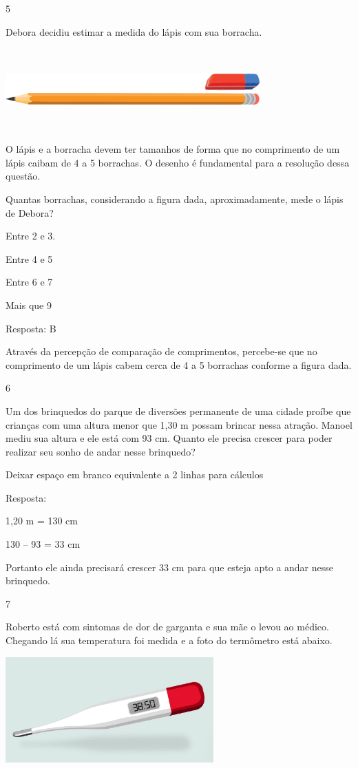 \begin{escolha}
\num{5}

Debora decidiu estimar a medida do lápis com sua borracha.

\includegraphics[width=3.84200in,height=1.23344in]{media/image46.png}

O lápis e a borracha devem ter tamanhos de forma que no comprimento de
um lápis caibam de 4 a 5 borrachas. O desenho é fundamental para a
resolução dessa questão.

Quantas borrachas, considerando a figura dada, aproximadamente, mede o
lápis de Debora?

\begin{escolha}
\item
  Entre 2 e 3.
\item
  Entre 4 e 5
\item
  Entre 6 e 7
\item
  Mais que 9
\end{escolha}

Resposta: B

Através da percepção de comparação de comprimentos, percebe-se que no
comprimento de um lápis cabem cerca de 4 a 5 borrachas conforme a figura
dada.

\num{6}

Um dos brinquedos do parque de diversões permanente de uma cidade proíbe
que crianças com uma altura menor que 1,30 m possam brincar nessa
atração. Manoel mediu sua altura e ele está com 93 cm. Quanto ele
precisa crescer para poder realizar seu sonho de andar nesse brinquedo?

Deixar espaço em branco equivalente a 2 linhas para cálculos

Resposta:

1,20 m = 130 cm

130 -- 93 = 33 cm

Portanto ele ainda precisará crescer 33 cm para que esteja apto a andar
nesse brinquedo.

\num{7}

Roberto está com sintomas de dor de garganta e sua mãe o levou ao
médico. Chegando lá sua temperatura foi medida e a foto do termômetro
está abaixo.

\includegraphics[width=3.15000in,height=1.59426in]{media/image47.png}


\end{escolha}
